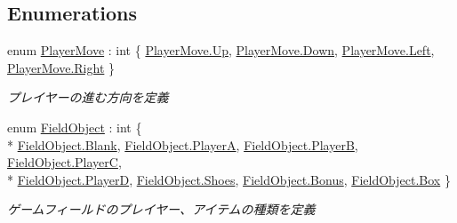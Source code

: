 \subsection*{Enumerations}
\begin{DoxyCompactItemize}
\item 
enum \hyperlink{namespacehoppin_1_1_game_information_afd961b6fde49f79a6a262a67a3683bb7}{Player\+Move} \+: int \{ \hyperlink{namespacehoppin_1_1_game_information_afd961b6fde49f79a6a262a67a3683bb7a258f49887ef8d14ac268c92b02503aaa}{Player\+Move.\+Up}, 
\hyperlink{namespacehoppin_1_1_game_information_afd961b6fde49f79a6a262a67a3683bb7a08a38277b0309070706f6652eeae9a53}{Player\+Move.\+Down}, 
\hyperlink{namespacehoppin_1_1_game_information_afd961b6fde49f79a6a262a67a3683bb7a945d5e233cf7d6240f6b783b36a374ff}{Player\+Move.\+Left}, 
\hyperlink{namespacehoppin_1_1_game_information_afd961b6fde49f79a6a262a67a3683bb7a92b09c7c48c520c3c55e497875da437c}{Player\+Move.\+Right}
 \}\begin{DoxyCompactList}\small\item\em プレイヤーの進む方向を定義 \end{DoxyCompactList}
\item 
enum \hyperlink{namespacehoppin_1_1_game_information_a550036a5a24113f1dbc2384284a03d18}{Field\+Object} \+: int \{ \\*
\hyperlink{namespacehoppin_1_1_game_information_a550036a5a24113f1dbc2384284a03d18ae4ef81cce7e4e10033ebb10962dfdd5e}{Field\+Object.\+Blank}, 
\hyperlink{namespacehoppin_1_1_game_information_a550036a5a24113f1dbc2384284a03d18aa1bae481dd7ac836a393e096bf573b59}{Field\+Object.\+PlayerA}, 
\hyperlink{namespacehoppin_1_1_game_information_a550036a5a24113f1dbc2384284a03d18a5139f83f74fb1c3f3258b365600e2ed4}{Field\+Object.\+PlayerB}, 
\hyperlink{namespacehoppin_1_1_game_information_a550036a5a24113f1dbc2384284a03d18a4d267cdcd36a642ff693beeac4bf25ee}{Field\+Object.\+PlayerC}, 
\\*
\hyperlink{namespacehoppin_1_1_game_information_a550036a5a24113f1dbc2384284a03d18aa9c108566e6aa364cafe313e95cb8c2d}{Field\+Object.\+PlayerD}, 
\hyperlink{namespacehoppin_1_1_game_information_a550036a5a24113f1dbc2384284a03d18aa60ba1a7a56c9e00252baebe89d62c12}{Field\+Object.\+Shoes}, 
\hyperlink{namespacehoppin_1_1_game_information_a550036a5a24113f1dbc2384284a03d18a3c0ee4bacc905ad4abb857127975acfc}{Field\+Object.\+Bonus}, 
\hyperlink{namespacehoppin_1_1_game_information_a550036a5a24113f1dbc2384284a03d18a3cfce651e667ab85486dd42a8185f98a}{Field\+Object.\+Box}
 \}\begin{DoxyCompactList}\small\item\em ゲームフィールドのプレイヤー、アイテムの種類を定義 \end{DoxyCompactList}
\end{DoxyCompactItemize}


